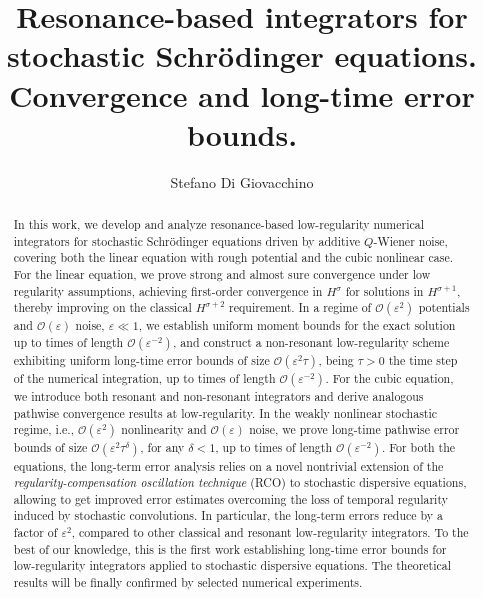 \documentclass[a4paper]{amsart}
\title[Resonance-based stochastic numerical integrators]{Resonance-based integrators for stochastic Schrödinger equations. Convergence and long-time error bounds.}
\author{Stefano Di Giovacchino}
\date{}
\begin{document}
\begin{abstract}
In this work, we develop and analyze resonance-based low-regularity numerical integrators for stochastic Schrödinger equations driven by additive $Q$-Wiener noise, covering both the linear equation with rough potential and the cubic nonlinear case.
For the linear equation, we prove strong and almost sure convergence under low regularity assumptions, achieving first-order convergence in $H^\sigma$ for solutions in $H^{\sigma+1}$, thereby improving on the classical $H^{\sigma+2}$ requirement. In a regime of $\mathcal{O}(\varepsilon^2)$ potentials and $\mathcal{O}(\varepsilon)$ noise, $\varepsilon \ll1 $, we establish uniform moment bounds for the exact solution up to times of length $\mathcal{O}(\varepsilon^{-2})$, and construct a non-resonant low-regularity scheme exhibiting uniform long-time error bounds of size $\mathcal{O}(\varepsilon^2 \tau)$, being $\tau>0$ the time step of the numerical integration, up to times of length $\mathcal{O}(\varepsilon^{-2}).$
For the cubic equation, we introduce both resonant and non-resonant integrators and derive analogous pathwise convergence results at low-regularity. In the weakly nonlinear stochastic regime, i.e., $\mathcal{O}(\varepsilon^2)$ nonlinearity and $\mathcal{O}(\varepsilon)$ noise, we prove long-time pathwise error bounds of size $\mathcal{O}(\varepsilon^2 \tau^\delta)$, for any $\delta<1$, up to times of length $\mathcal{O}(\varepsilon^{-2})$.
For both the equations, the long-term error analysis relies on a novel nontrivial extension of the {\em regularity-compensation oscillation technique} (RCO) to stochastic dispersive equations, allowing to get improved error estimates overcoming the loss of temporal regularity induced by stochastic convolutions. In particular, the long-term errors reduce by a factor of $\varepsilon^2$, compared to other classical and resonant low-regularity integrators.
To the best of our knowledge, this is the first work establishing long-time error bounds for low-regularity integrators applied to stochastic dispersive equations. The theoretical results will be finally confirmed by selected numerical experiments.
\end{abstract}
\maketitle
 
\end{document}

